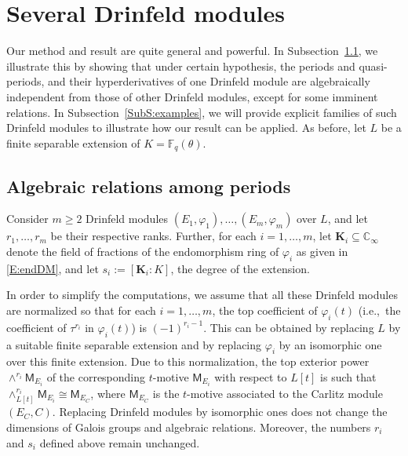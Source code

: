 \documentclass[10pt,a4paper]{amsart}
\theoremstyle{plain} %
\theoremstyle{definition}
\theoremstyle{remark}
\newcommand{\CC}{\mathbb{C}}
\newcommand{\FF}{\mathbb{F}}
\newcommand{\Fq}{\FF_{\!q}}  %
\newcommand{\KI}{\mathbb{K}_{\infty}}  %
\newcommand{\CI}{\CC_{\infty}}  %
\newcommand{\mot}{\mathsf{M}}  %
\numberwithin{equation}{subsection}
\begin{document}
\section{Several Drinfeld modules}\label{S:non-isogenous-Drinfeld-modules}
Our method and result are quite general and powerful.
In Subsection~\ref{SubS:nDMs}, we illustrate this by showing that under certain hypothesis, the periods and quasi-periods, and their hyperderivatives of one Drinfeld module are algebraically independent from those of other Drinfeld modules, except for some imminent relations. In Subsection~\ref{SubS:examples}, we will provide explicit families of such Drinfeld modules to illustrate how our result can be applied. As before, let $L$ be a finite separable extension of $K=\Fq(\theta)$.


\subsection{Algebraic relations among periods}\label{SubS:nDMs}

 Consider $m\geq 2$ Drinfeld modules $(E_1,\varphi_1), \ldots, (E_m,\varphi_m)$ over $L$, and let $r_1,\ldots, r_m$ be their respective ranks.
Further, for each $i=1,\ldots, m$, let $\mathbf{K}_i\subseteq \CI$ denote the field of fractions of the endomorphism ring of $\varphi_i$ as given in \eqref{E:endDM}, and let $s_i:=[\mathbf{K}_i:K]$, the degree of the extension.

In order to simplify the computations, we assume that all these Drinfeld modules are normalized so that for each $i=1,\ldots, m$, the top coefficient of $\varphi_i(t)$ (i.e.,~the coefficient of $\tau^{r_i}$ in $\varphi_i(t)$) is $(-1)^{r_i-1}$. This can be obtained by replacing $L$ by a suitable finite separable extension and by replacing $\varphi_i$ by an isomorphic one over this finite extension. 
Due to this normalization, the top exterior power $\wedge^{r_i} \mot_{E_i}$ of the corresponding $t$-motive $\mot_{E_i}$ with respect to $L[t]$ is such that $\wedge_{L[t]}^{r_i} \mot_{E_i} \cong \mot_{E_C}$, where $\mot_{E_C}$ is the $t$-motive associated to the Carlitz module $(E_C,C)$. 
Replacing Drinfeld modules by isomorphic ones does not change the dimensions of Galois groups and algebraic relations. Moreover,  the numbers $r_i$ and $s_i$ defined above remain unchanged.

\medskip
\end{document}

